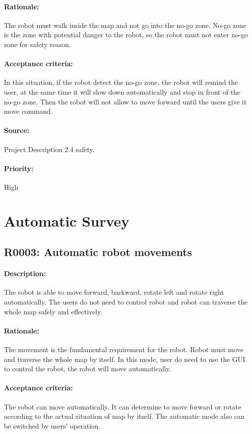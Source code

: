 \documentclass[11pt, a4paper]{report}
\begin{document}
\paragraph{Rationale:}
 The robot must walk inside the map and not go into the no-go zone.  No-go zone is the zone with potential danger to the robot, so the robot must not enter no-go zone for safety reason.
\paragraph{Acceptance criteria:}
 In this situation, if the robot detect the no-go zone, the robot will remind the user, at the same time it will slow down automatically and stop in front of the no-go zone. Then the robot will not allow to move forward until the users give it move command.
\paragraph{Source:}
Project Description 2.4 safety.   
\paragraph{Priority:}
High


\section{Automatic Survey}
\subsection{R0003: Automatic robot movements }
\paragraph{Description:}
The robot is able to move forward, backward, rotate left and rotate right automatically. The users do not need to control robot and robot can traverse the whole map safely and effectively.
\paragraph{Rationale:}
The movement is the fundamental requirement for the robot. Robot must move and traverse the whole map by itself. In this mode, user do need to use the GUI to control the robot, the robot will move automatically.    
\paragraph{Acceptance criteria:}
The robot can move automatically. It can determine to move forward or rotate according to the actual situation of map by itself. The automatic mode also can be switched by users' operation.  
\end{document}
